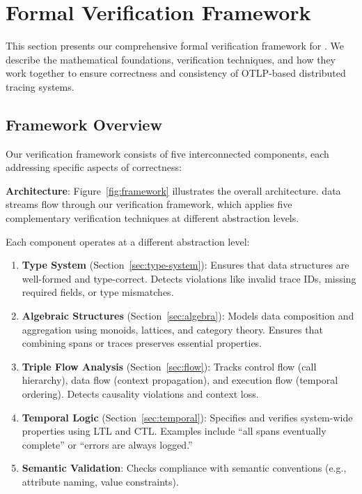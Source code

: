 
\section{Formal Verification Framework}
\label{sec:framework}

This section presents our comprehensive formal verification framework for \otlp. We describe the mathematical foundations, verification techniques, and how they work together to ensure correctness and consistency of OTLP-based distributed tracing systems.

\subsection{Framework Overview}
\label{sec:framework-overview}

Our verification framework consists of five interconnected components, each addressing specific aspects of \otlp correctness:

\textbf{Architecture}: Figure~\ref{fig:framework} illustrates the overall architecture. \otlp data streams flow through our verification framework, which applies five complementary verification techniques at different abstraction levels.


Each component operates at a different abstraction level:

\begin{enumerate}
\item \textbf{Type System} (Section~\ref{sec:type-system}): Ensures that \otlp data structures are well-formed and type-correct. Detects violations like invalid trace IDs, missing required fields, or type mismatches.

\item \textbf{Algebraic Structures} (Section~\ref{sec:algebra}): Models data composition and aggregation using monoids, lattices, and category theory. Ensures that combining spans or traces preserves essential properties.

\item \textbf{Triple Flow Analysis} (Section~\ref{sec:flow}): Tracks control flow (call hierarchy), data flow (context propagation), and execution flow (temporal ordering). Detects causality violations and context loss.

\item \textbf{Temporal Logic} (Section~\ref{sec:temporal}): Specifies and verifies system-wide properties using LTL and CTL. Examples include ``all spans eventually complete'' or ``errors are always logged.''

\item \textbf{Semantic Validation}: Checks compliance with \otlp semantic conventions (e.g., attribute naming, value constraints).
\end{enumerate}

